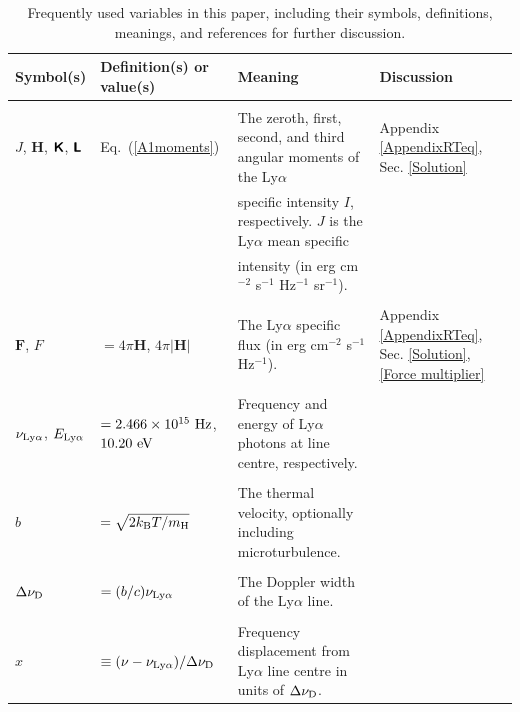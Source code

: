 \documentclass[fleqn,usenatbib]{mnras}
\begin{document}
\begin{table}
\caption{Frequently used variables in this paper, including their symbols, definitions, meanings, and references for further discussion.}
\begin{tabular}{l l l l }
\hline
\hline
Symbol(s) & Definition(s) or value(s) & Meaning   & Discussion   \\

\hline
\hline

\\

 $J$, $\boldsymbol{H}$, $\textbf{\textsf{K}}$, $\textbf{\textsf{L}}$ & Eq.~(\ref{A1moments})  & The zeroth, first, second, and third angular moments of the Ly$\alpha$ &  Appendix \ref{AppendixRTeq}, Sec. \ref{Solution} \\ 

 &    &specific intensity $I$, respectively. $J$ is the Ly$\alpha$ mean specific  &  \\ 

 &    &intensity (in erg cm$^{-2}$ s$^{-1}$ Hz$^{-1}$ sr$^{-1}$).   &  \\ 

 \\

 $\boldsymbol{F}$, $F$ & $= 4 \pi \boldsymbol{H}$, $4\pi \lvert \boldsymbol{H} \rvert$   & The Ly$\alpha$ specific flux (in erg cm$^{-2}$ s$^{-1}$ Hz$^{-1}$). & Appendix \ref{AppendixRTeq}, Sec. \ref{Solution}, \ref{Force multiplier} \\ 

  \\
 
   $\nu_{\rm Ly\alpha}$, $E_{\rm Ly\alpha}$ &  $= 2.466 \times 10^{15} ~ \rm Hz$, $10.20 ~ \rm eV$  & Frequency and energy of Ly$\alpha$ photons at line centre, respectively. &  \\ 

  \\
 
   $b$ &  $= \sqrt{ 2k_{\rm B}T/m_{\rm H}}$  & The thermal velocity, optionally including microturbulence. &  \\ 

  \\

  $\Delta \nu_{\rm D}$ &  $= (b/c) \nu_{\rm Ly\alpha}$  & The Doppler width of the Ly$\alpha$ line. &  \\ 

  \\
 
   $x$ &  $\equiv (\nu - \nu_{\rm Ly\alpha})/\Delta \nu_{\rm D}$  & Frequency displacement from Ly$\alpha$ line centre in units of $\Delta \nu_{\rm D}$. &  \\ 
 

\end{tabular}
\end{table}
\end{document}
